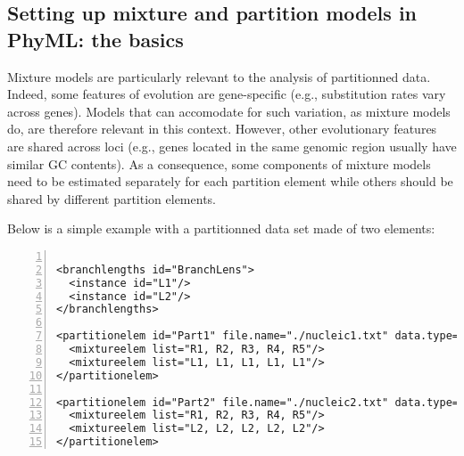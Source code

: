 \documentclass[a4paper,12pt]{article}
\begin{document}



\subsection{Setting up mixture and partition models in PhyML: the basics}

Mixture models are particularly relevant to the analysis of partitionned data. Indeed, some features
of  evolution are  gene-specific (e.g.,  substitution  rates vary  across genes).   Models that  can
accomodate  for such  variation,  as mixture  models do,  are  therefore relevant  in this  context.
However, other evolutionary features are shared across loci (e.g., genes located in the same genomic
region usually have similar  GC contents). As a consequence, some components  of mixture models need
to be  estimated separately for each  partition element while  others should be shared  by different
partition elements.

Below is a simple example with a partitionned data set made of two elements:

\vspace{0.2cm}
\begin{Verbatim}[frame=single, label=Two sets of branch lengths (one per partition element),
  samepage=true, baselinestretch=0.5, fontsize=\small, numbers=left]

<branchlengths id="BranchLens">
  <instance id="L1"/>
  <instance id="L2"/>
</branchlengths>

<partitionelem id="Part1" file.name="./nucleic1.txt" data.type="nt">
  <mixtureelem list="R1, R2, R3, R4, R5"/>
  <mixtureelem list="L1, L1, L1, L1, L1"/>
</partitionelem>

<partitionelem id="Part2" file.name="./nucleic2.txt" data.type="nt">
  <mixtureelem list="R1, R2, R3, R4, R5"/>
  <mixtureelem list="L2, L2, L2, L2, L2"/>
</partitionelem>

\end{Verbatim}
\end{document}
